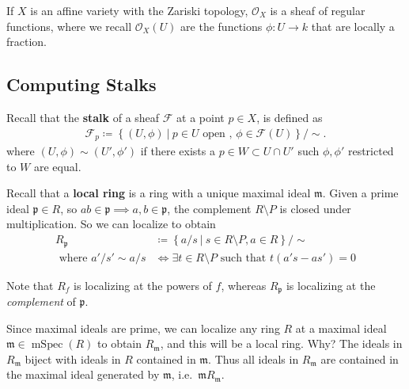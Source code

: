 \begin{example}

If \(X\) is an affine variety with the Zariski topology,
\(\mathcal{O}_X\) is a sheaf of regular functions, where we recall
\(\mathcal{O}_X(U)\) are the functions \(\phi: U\to k\) that are locally
a fraction.

\end{example}

\hypertarget{computing-stalks}{%
\subsection{Computing Stalks}\label{computing-stalks}}

Recall that the \textbf{stalk} of a sheaf \(\mathcal{F}\) at a point
\(p\in X\), is defined as
\begin{align*}  
\mathcal{F}_p \coloneqq\left\{{(U, \phi) {~\mathrel{\Big|}~}p\in U \text{ open },\, \phi \in \mathcal{F}(U)}\right\}/\sim
.\end{align*}
where \((U, \phi) \sim (U', \phi')\) if there exists a
\(p\in W \subset U\cap U'\) such \(\phi, \phi'\) restricted to \(W\) are
equal.

Recall that a \textbf{local ring} is a ring with a unique maximal ideal
\({\mathfrak{m}}\). Given a prime ideal \({\mathfrak{p}}\in R\), so
\(ab\in {\mathfrak{p}}\implies a,b\in {\mathfrak{p}}\), the complement
\(R\setminus P\) is closed under multiplication. So we can localize to
obtain
\begin{align*}
R_{\mathfrak{p}}&\coloneqq\left\{{a/s {~\mathrel{\Big|}~}s\in R\setminus P, a\in R}\right\}/\sim \\
\text{ where } a'/s' \sim a/s &\iff \exists t\in R\setminus P \text{ such that } t(a's - as') = 0
\end{align*}

\begin{warnings}

Note that \(R_f\) is localizing at the powers of \(f\), whereas
\(R_{\mathfrak{p}}\) is localizing at the \emph{complement} of
\({\mathfrak{p}}\).

\end{warnings}

Since maximal ideals are prime, we can localize any ring \(R\) at a
maximal ideal \(\mathfrak{m} \in \operatorname{mSpec}(R)\) to obtain
\(R_{\mathfrak{m}}\), and this will be a local ring. Why? The ideals in
\(R_{\mathfrak{m}}\) biject with ideals in \(R\) contained in
\({\mathfrak{m}}\). Thus all ideals in \(R_{\mathfrak{m}}\) are
contained in the maximal ideal generated by \({\mathfrak{m}}\),
i.e.~\({\mathfrak{m}}R_{\mathfrak{m}}\).


